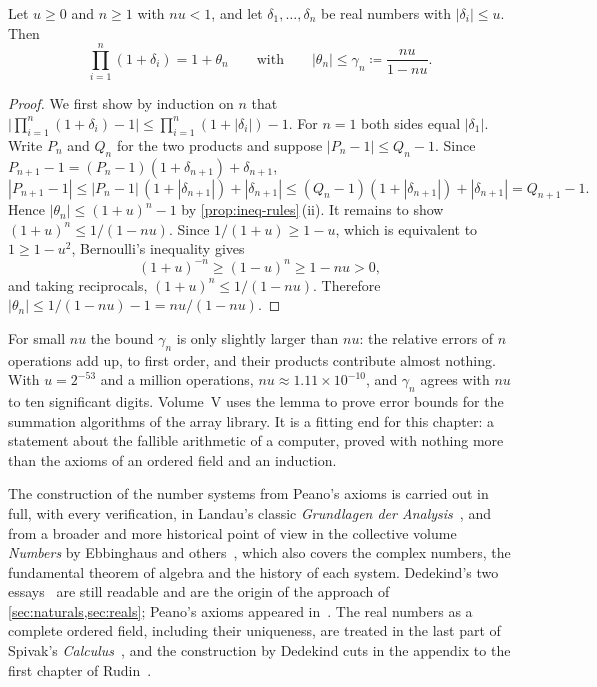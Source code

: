 \begin{lemma}
\label{lem:gamma}
Let $u\ge0$ and $n\ge1$ with $nu<1$, and let $\delta_1,\ldots,\delta_n$ be real numbers with $|\delta_i|\le u$. Then
\[
\prod_{i=1}^n(1+\delta_i)=1+\theta_n\qquad\text{with}\qquad|\theta_n|\le\gamma_n\coloneqq\frac{nu}{1-nu}.
\]
\end{lemma}

\begin{proof}
We first show by induction on $n$ that $\bigl|\prod_{i=1}^n(1+\delta_i)-1\bigr|\le\prod_{i=1}^n(1+|\delta_i|)-1$. For $n=1$ both sides equal $|\delta_1|$. Write $P_n$ and $Q_n$ for the two products and suppose $|P_n-1|\le Q_n-1$. Since $P_{n+1}-1=(P_n-1)(1+\delta_{n+1})+\delta_{n+1}$,
\[
|P_{n+1}-1|\le|P_n-1|\,(1+|\delta_{n+1}|)+|\delta_{n+1}|\le(Q_n-1)(1+|\delta_{n+1}|)+|\delta_{n+1}|=Q_{n+1}-1 .
\]
Hence $|\theta_n|\le(1+u)^n-1$ by \cref{prop:ineq-rules}\,(ii). It remains to show $(1+u)^n\le1/(1-nu)$. Since $1/(1+u)\ge1-u$, which is equivalent to $1\ge1-u^2$, Bernoulli's inequality gives
\[
(1+u)^{-n}\ge(1-u)^n\ge1-nu>0 ,
\]
and taking reciprocals, $(1+u)^n\le1/(1-nu)$. Therefore $|\theta_n|\le1/(1-nu)-1=nu/(1-nu)$.
\end{proof}

For small $nu$ the bound $\gamma_n$ is only slightly larger than $nu$: the relative errors of $n$ operations add up, to first order, and their products contribute almost nothing. With $u=2^{-53}$ and a million operations, $nu\approx1.11\times10^{-10}$, and $\gamma_n$ agrees with $nu$ to ten significant digits. Volume~V uses the lemma to prove error bounds for the summation algorithms of the array library. It is a fitting end for this chapter: a statement about the fallible arithmetic of a computer, proved with nothing more than the axioms of an ordered field and an induction.

\chapternotes

The construction of the number systems from Peano's axioms is carried out in full, with every verification, in Landau's classic \emph{Grundlagen der Analysis}~\cite{landau1930}, and from a broader and more historical point of view in the collective volume \emph{Numbers} by Ebbinghaus and others~\cite{ebbinghaus1991}, which also covers the complex numbers, the fundamental theorem of algebra and the history of each system. Dedekind's two essays~\cite{dedekind1872,dedekind1888} are still readable and are the origin of the approach of \cref{sec:naturals,sec:reals}; Peano's axioms appeared in~\cite{peano1889}. The real numbers as a complete ordered field, including their uniqueness, are treated in the last part of Spivak's \emph{Calculus}~\cite{spivak2008calculus}, and the construction by Dedekind cuts in the appendix to the first chapter of Rudin~\cite{rudin1976}.

